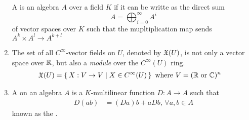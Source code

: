 \documentclass[10pt,a4paper]{report}
\begin{document}
\begin{enumerate}
	A  is an algebra $A$ over a field $K$ if it can be writte as the direct sum $$ A = \bigoplus_{i=0}^\infty A^i$$ of vector spaces over $K$ such that the mupltiplication map sends $A^k \times A^l \to A^{k+l}$
	
	\item The set of all $C^\infty$-vector fields on $U$, denoted by $\mathfrak{X}(U)$, is not only a vector space over $\mathbb{R}$, but also a \textit{module} over the $C^\infty(U)$ ring. \begin{align*}
		\mathfrak{X}(U) &= \left \{\,  X : V \to V \;|\; X \in C^\infty(U) \,\right \} \text{ where } V = (\mathbb{R} \text{ or } \mathbb{C})^n
	\end{align*}
	\item {} A  on an algebra $A$ is a $K$-multilinear function $D:A \to A$ such that 
	\begin{align*}
		D(ab) &= (Da)b+aDb, \, \forall a,b \in A
	\end{align*}known as the .
	

\end{enumerate}
\end{document}
